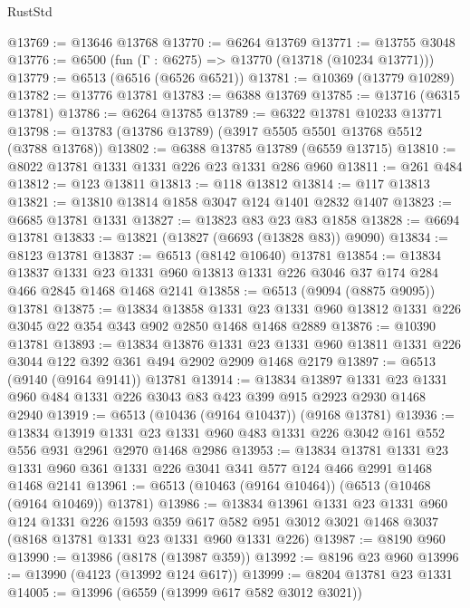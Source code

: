 \begin{lexlean}{RustStd}
\begin{coremodule}
@13769 := @13646 @13768
@13770 := @6264 @13769
@13771 := @13755 @3048
@13776 := @6500 (fun (Γ : @6275) => @13770 (@13718 (@10234 @13771)))
@13779 := @6513 (@6516 (@6526 @6521))
@13781 := @10369 (@13779 @10289)
@13782 := @13776 @13781
@13783 := @6388 @13769
@13785 := @13716 (@6315 @13781)
@13786 := @6264 @13785
@13789 := @6322 @13781 @10233 @13771
@13798 := @13783 (@13786 @13789) (@3917 @5505 @5501 @13768 @5512 (@3788 @13768))
@13802 := @6388 @13785 @13789 (@6559 @13715)
@13810 := @8022 @13781 @1331 @1331 @226 @23 @1331 @286 @960
@13811 := @261 @484
@13812 := @123 @13811
@13813 := @118 @13812
@13814 := @117 @13813
@13821 := @13810 @13814 @1858 @3047 @124 @1401 @2832 @1407
@13823 := @6685 @13781 @1331
@13827 := @13823 @83 @23 @83 @1858
@13828 := @6694 @13781
@13833 := @13821 (@13827 (@6693 (@13828 @83)) @9090)
@13834 := @8123 @13781
@13837 := @6513 (@8142 @10640) @13781
@13854 := @13834
    @13837
    @1331
    @23
    @1331
    @960
    @13813
    @1331
    @226
    @3046
    @37
    @174
    @284
    @466
    @2845
    @1468
    @1468
    @2141
@13858 := @6513 (@9094 (@8875 @9095)) @13781
@13875 := @13834
    @13858
    @1331
    @23
    @1331
    @960
    @13812
    @1331
    @226
    @3045
    @22
    @354
    @343
    @902
    @2850
    @1468
    @1468
    @2889
@13876 := @10390 @13781
@13893 := @13834
    @13876
    @1331
    @23
    @1331
    @960
    @13811
    @1331
    @226
    @3044
    @122
    @392
    @361
    @494
    @2902
    @2909
    @1468
    @2179
@13897 := @6513 (@9140 (@9164 @9141)) @13781
@13914 := @13834
    @13897
    @1331
    @23
    @1331
    @960
    @484
    @1331
    @226
    @3043
    @83
    @423
    @399
    @915
    @2923
    @2930
    @1468
    @2940
@13919 := @6513 (@10436 (@9164 @10437)) (@9168 @13781)
@13936 := @13834
    @13919
    @1331
    @23
    @1331
    @960
    @483
    @1331
    @226
    @3042
    @161
    @552
    @556
    @931
    @2961
    @2970
    @1468
    @2986
@13953 := @13834
    @13781
    @1331
    @23
    @1331
    @960
    @361
    @1331
    @226
    @3041
    @341
    @577
    @124
    @466
    @2991
    @1468
    @1468
    @2141
@13961 := @6513 (@10463 (@9164 @10464)) (@6513 (@10468 (@9164 @10469)) @13781)
@13986 := @13834
    @13961
    @1331
    @23
    @1331
    @960
    @124
    @1331
    @226
    @1593
    @359
    @617
    @582
    @951
    @3012
    @3021
    @1468
    @3037
    (@8168 @13781 @1331 @23 @1331 @960 @1331 @226)
@13987 := @8190 @960
@13990 := @13986 (@8178 (@13987 @359))
@13992 := @8196 @23 @960
@13996 := @13990 (@4123 (@13992 @124 @617))
@13999 := @8204 @13781 @23 @1331
@14005 := @13996 (@6559 (@13999 @617 @582 @3012 @3021))

\end{coremodule}
\end{lexlean}

